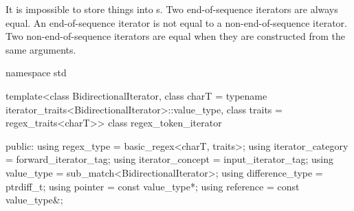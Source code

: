 \pnum
{}%
It is impossible to store things
into s. Two end-of-sequence iterators are always
equal. An end-of-sequence iterator is not equal to a
non-end-of-sequence iterator. Two non-end-of-sequence iterators are
equal when they are constructed from the same arguments.

\begin{codeblock}
namespace std {
  template<class BidirectionalIterator,
           class charT = typename iterator_traits<BidirectionalIterator>::value_type,
           class traits = regex_traits<charT>>
  class regex_token_iterator {
  public:
    using regex_type        = basic_regex<charT, traits>;
    using iterator_category = forward_iterator_tag;
    using iterator_concept  = input_iterator_tag;
    using value_type        = sub_match<BidirectionalIterator>;
    using difference_type   = ptrdiff_t;
    using pointer           = const value_type*;
    using reference         = const value_type&;

}}
\end{codeblock}
